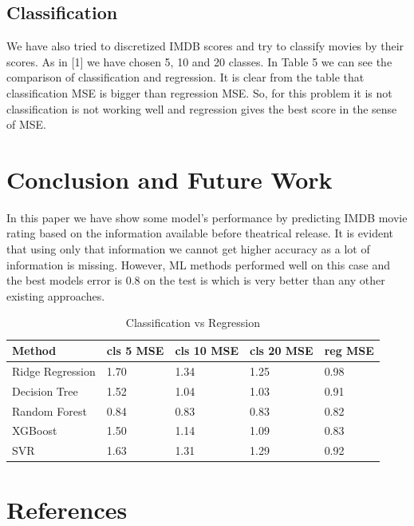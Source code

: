\documentclass{article}
\begin{document}
\subsection{Classification}

We have also tried to discretized IMDB scores and try to classify movies by their scores. As in [1] we have chosen 5, 10  and 20 classes. In Table 5 we can see the comparison of classification and regression. It is clear from the table that classification MSE is bigger than regression MSE. So, for this problem it is not classification is not working well and regression gives the best score in the sense of MSE. 

\section{Conclusion and Future Work}

In this paper we have show some model's performance by predicting IMDB movie rating based on the information available before theatrical release. It is evident that using only that information we cannot get higher accuracy as a lot of information is missing. However, ML methods performed well on this case and the best models error is 0.8 on the test is which is very better than any other existing approaches. 

\begin{table}
  \caption{Classification vs Regression}
  \label{cls_vs_reg}
  \centering
  \begin{tabular}{lllll}
    \toprule
    Method & cls 5 MSE & cls 10 MSE & cls 20 MSE & reg MSE   \\
    \midrule
    Ridge Regression  & 1.70 & 1.34  & 1.25 & 0.98    \\
    Decision Tree & 1.52 & 1.04 & 1.03 & 0.91 \\
    Random Forest & 0.84 & 0.83  & 0.83 & 0.82 \\
    XGBoost   &1.50 & 1.14  & 1.09 & 0.83 \\
    SVR  & 1.63 & 1.31 & 1.29 & 0.92 \\
        \bottomrule
  \end{tabular}
\end{table}

\section*{References}
\label{reference}

\small
\end{document}

